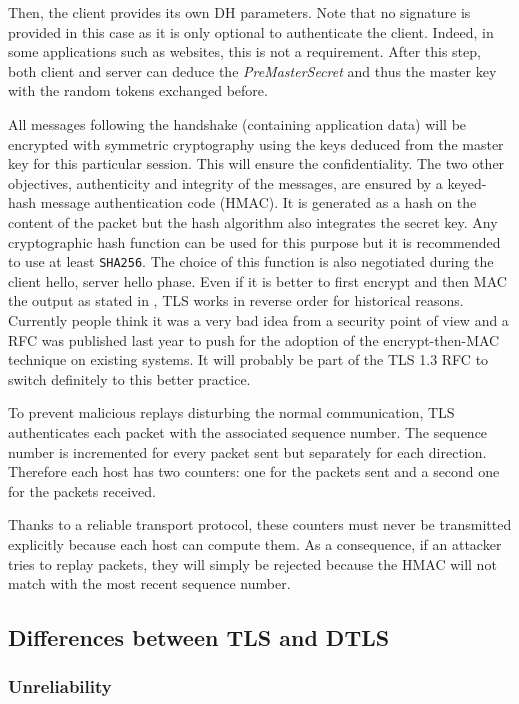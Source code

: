 Then, the client provides its own DH parameters. Note that no signature is provided in this case as it is only optional to authenticate the client. Indeed, in some applications such as websites, this is not a requirement. After this step, both client and server can deduce the \textit{PreMasterSecret} and thus the master key with the random tokens exchanged before.

All messages following the handshake (containing application data) will be encrypted with symmetric cryptography using the keys deduced from the master key for this particular session. This will ensure the confidentiality. The two other objectives, authenticity and integrity of the messages, are ensured by a keyed-hash message authentication code (HMAC). It is generated as a hash on the content of the packet but the hash algorithm also integrates the secret key. Any cryptographic hash function can be used for this purpose but it is recommended to use at least \texttt{SHA256}. The choice of this function is also negotiated during the client hello, server hello phase. Even if it is better to first encrypt and then MAC the output as stated in \cite{bellare2000authenticated}, TLS works in reverse order for historical reasons. Currently people think it was a very bad idea from a security point of view and a RFC \cite{RFC7366} was published last year to push for the adoption of the encrypt-then-MAC technique on existing systems. It will probably be part of the TLS 1.3 RFC \cite{draft-tls13} to switch definitely to this better practice.

To prevent malicious replays disturbing the normal communication, TLS authenticates each packet with the associated sequence number. The sequence number is incremented for every packet sent but separately for each direction. Therefore each host has two counters: one for the packets sent and a second one for the packets received.

Thanks to a reliable transport protocol, these counters must never be transmitted explicitly because each host can compute them. As a consequence, if an attacker tries to replay packets, they will simply be rejected because the HMAC will not match with the most recent sequence number.

\subsection{Differences between TLS and DTLS}

\subsubsection{Unreliability}

